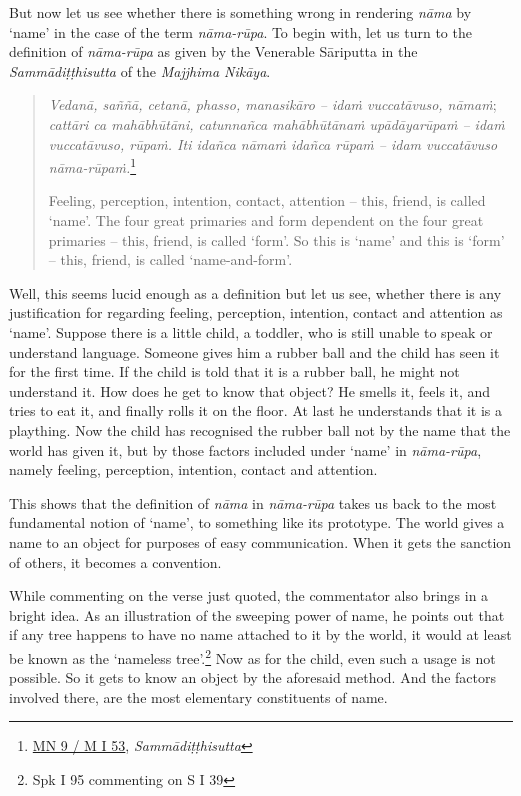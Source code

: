 But now let us see whether there is something wrong in rendering \emph{nāma} by `name' in the case of the term \emph{nāma-rūpa}. To begin with, let us turn to the definition of \emph{nāma-rūpa} as given by the Venerable Sāriputta in the \emph{Sammādiṭṭhisutta} of the \emph{Majjhima Nikāya}.

\clearpage

\begin{quote}
\emph{Vedanā, saññā, cetanā, phasso, manasikāro -- idaṁ vuccatāvuso, nāmaṁ}; \emph{cattāri ca mahābhūtāni, catunnañca mahābhūtānaṁ upādāyarūpaṁ -- idaṁ vuccatāvuso, rūpaṁ. Iti idañca nāmaṁ idañca rūpaṁ -- idam vuccatāvuso nāma-rūpaṁ.}\footnote{\href{https://suttacentral.net/mn9/pli/ms}{MN 9 / M I 53}, \emph{Sammādiṭṭhisutta}}

Feeling, perception, intention, contact, attention -- this, friend, is called `name'. The four great primaries and form dependent on the four great primaries -- this, friend, is called `form'. So this is `name' and this is `form' -- this, friend, is called `name-and-form'.
\end{quote}

Well, this seems lucid enough as a definition but let us see, whether there is any justification for regarding feeling, perception, intention, contact and attention as `name'. Suppose there is a little child, a toddler, who is still unable to speak or understand language. Someone gives him a rubber ball and the child has seen it for the first time. If the child is told that it is a rubber ball, he might not understand it. How does he get to know that object? He smells it, feels it, and tries to eat it, and finally rolls it on the floor. At last he understands that it is a plaything. Now the child has recognised the rubber ball not by the name that the world has given it, but by those factors included under `name' in \emph{nāma-rūpa}, namely feeling, perception, intention, contact and attention.

This shows that the definition of \emph{nāma} in \emph{nāma-rūpa} takes us back to the most fundamental notion of `name', to something like its prototype. The world gives a name to an object for purposes of easy communication. When it gets the sanction of others, it becomes a convention.

While commenting on the verse just quoted, the commentator also brings in a bright idea. As an illustration of the sweeping power of name, he points out that if any tree happens to have no name attached to it by the world, it would at least be known as the `nameless tree'.\footnote{Spk I 95 commenting on S I 39} Now as for the child, even such a usage is not possible. So it gets to know an object by the aforesaid method. And the factors involved there, are the most elementary constituents of name.

